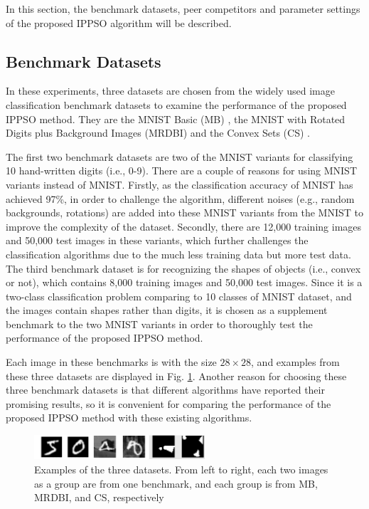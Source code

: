 \documentclass[conference]{IEEEtran}
\begin{document}
In this section, the benchmark datasets, peer competitors and parameter settings of the proposed IPPSO algorithm will be described. 


\subsection{Benchmark Datasets}\label{sec:EPDatasets}

In these experiments, three datasets are chosen from the widely used image classification benchmark datasets to examine the performance of the proposed IPPSO method. They are the MNIST Basic (MB) \cite{DeepArchitectureEval:Larochelle}, the MNIST with Rotated Digits plus Background Images (MRDBI) \cite{DeepArchitectureEval:Larochelle} and the Convex Sets (CS) \cite{DeepArchitectureEval:Larochelle}. 

The first two benchmark datasets are two of the MNIST \cite{DocumentRecognition:LeCun} variants for classifying 10 hand-written digits (i.e., 0-9). There are a couple of reasons for using MNIST variants instead of MNIST. Firstly, as the classification accuracy of MNIST has achieved 97\%, in order to challenge the algorithm, different noises (e.g., random backgrounds, rotations) are added into these MNIST variants from the MNIST to improve the complexity of the dataset. Secondly, there are 12,000 training images and 50,000 test images in these variants, which further challenges the classification algorithms due to the much less training data but more test data. The third benchmark dataset is for recognizing the shapes of objects (i.e., convex or not), which contains 8,000 training images and 50,000 test images. Since it is a two-class classification problem comparing to 10 classes of MNIST dataset, and the images contain shapes rather than digits, it is chosen as a supplement benchmark to the two MNIST variants in order to thoroughly test the performance of the proposed IPPSO method. 

Each image in these benchmarks is with the size $28 \times 28$, and examples from these three datasets are displayed in Fig. \ref{fig:images}. Another reason for choosing these three benchmark datasets is that different algorithms have reported their promising results, so it is convenient for comparing the performance of the proposed IPPSO method with these existing algorithms.

\begin{figure}[!t]
	\centering
	\includegraphics[width=2.5in]{ippso_image_samples}
	\caption{Examples of the three datasets. From left to right, each two images as a group are from one benchmark, and each group is from MB, MRDBI, and CS, respectively}
	\label{fig:images}
\end{figure}
\end{document}
